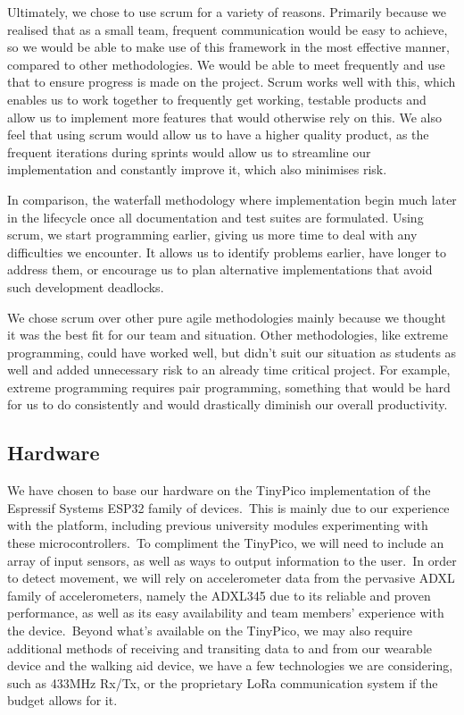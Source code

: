             Ultimately, we chose to use scrum for a variety of reasons. Primarily because we realised that as a small
            team, frequent communication would be easy to achieve, so we would be able to make use of this framework in
            the most effective manner, compared to other methodologies. We would be able to meet frequently and use that
            to ensure progress is made on the project. Scrum works well with this, which enables us to work together to
            frequently get working, testable products and allow us to implement more features that would otherwise rely
            on this. We also feel that using scrum would allow us to have a higher quality product, as the frequent
            iterations during sprints would allow us to streamline our implementation and constantly improve it, which
            also minimises risk.

            In comparison, the waterfall methodology where implementation begin much later in the lifecycle once all
            documentation and test suites are formulated. Using scrum, we start programming earlier, giving us more time
            to deal with any difficulties we encounter. It allows us to identify problems earlier, have longer to
            address them, or encourage us to plan alternative implementations that avoid such development deadlocks.

            We chose scrum over other pure agile methodologies mainly because we thought it was the best fit for our
            team and situation. Other methodologies, like extreme programming, could have worked well, but didn’t suit
            our situation as students as well and added unnecessary risk to an already time critical project. For
            example, extreme programming requires pair programming, something that would be hard for us to do
            consistently and would drastically diminish our overall productivity.
    
        \subsection{Hardware}
            We have chosen to base our hardware on the TinyPico implementation of the Espressif Systems ESP32 family of
            devices.\ This is mainly due to our experience with the platform, including previous university modules
            experimenting with these microcontrollers.\ To compliment the TinyPico, we will need to include an array of
            input sensors, as well as ways to output information to the user.\ In order to detect movement, we will rely
            on accelerometer data from the pervasive ADXL family of accelerometers, namely the ADXL345 due to its
            reliable and proven performance, as well as its easy availability and team members' experience with the
            device.\ Beyond what's available on the TinyPico, we may also require additional methods of receiving and
            transiting data to and from our wearable device and the walking aid device, we have a few technologies we
            are considering, such as 433MHz Rx/Tx, or the proprietary LoRa communication system if the budget allows for
            it.

